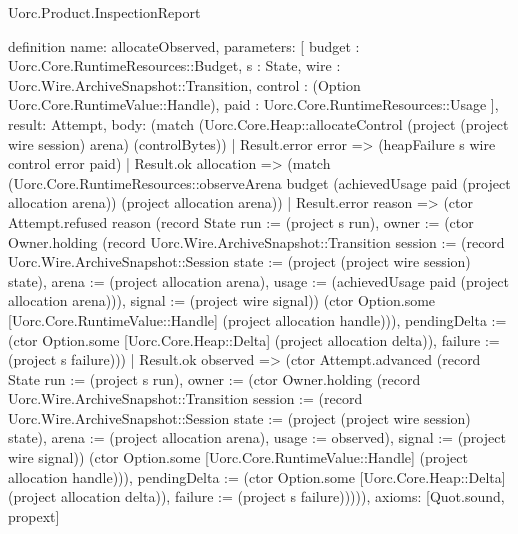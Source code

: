 \begin{lexlean}{Uorc.Product.InspectionReport}
\begin{semanticmodule}
definition{
  name: allocateObserved,
  parameters: [
    budget : Uorc.Core.RuntimeResources::Budget,
    s : State,
    wire : Uorc.Wire.ArchiveSnapshot::Transition,
    control : (Option Uorc.Core.RuntimeValue::Handle),
    paid : Uorc.Core.RuntimeResources::Usage
  ],
  result: Attempt,
  body: (match (Uorc.Core.Heap::allocateControl (project (project wire session) arena) (controlBytes))
    | Result.error error => (heapFailure s wire control error paid)
    | Result.ok allocation => (match (Uorc.Core.RuntimeResources::observeArena budget (achievedUsage paid (project allocation arena)) (project allocation arena))
      | Result.error reason => (ctor Attempt.refused reason (record State {run := (project s run), owner := (ctor Owner.holding (record Uorc.Wire.ArchiveSnapshot::Transition {session := (record Uorc.Wire.ArchiveSnapshot::Session {state := (project (project wire session) state), arena := (project allocation arena), usage := (achievedUsage paid (project allocation arena))}), signal := (project wire signal)}) (ctor Option.some [Uorc.Core.RuntimeValue::Handle] (project allocation handle))), pendingDelta := (ctor Option.some [Uorc.Core.Heap::Delta] (project allocation delta)), failure := (project s failure)}))
      | Result.ok observed => (ctor Attempt.advanced (record State {run := (project s run), owner := (ctor Owner.holding (record Uorc.Wire.ArchiveSnapshot::Transition {session := (record Uorc.Wire.ArchiveSnapshot::Session {state := (project (project wire session) state), arena := (project allocation arena), usage := observed}), signal := (project wire signal)}) (ctor Option.some [Uorc.Core.RuntimeValue::Handle] (project allocation handle))), pendingDelta := (ctor Option.some [Uorc.Core.Heap::Delta] (project allocation delta)), failure := (project s failure)})))),
  axioms: [Quot.sound, propext]
}


\end{semanticmodule}
\end{lexlean}
